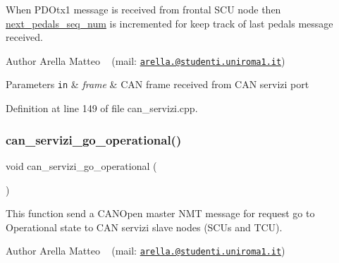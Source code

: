 When P\+D\+Otx1 message is received from frontal S\+CU node then \mbox{\hyperlink{group___c_a_n__servizi__group_gadcbd4ad67b50cf61731266bf5c5ba158}{next\+\_\+pedals\+\_\+seq\+\_\+num}} is incremented for keep track of last pedals message received.

\begin{DoxyAuthor}{Author}
Arella Matteo ~\newline
 (mail\+: \href{mailto:arella.1646983@studenti.uniroma1.it}{\tt arella.@studenti.\+uniroma1.\+it})
\end{DoxyAuthor}

\begin{DoxyParams}[1]{Parameters}
\mbox{\tt in}  & {\em frame} & C\+AN frame received from C\+AN servizi port \\
\hline
\end{DoxyParams}


Definition at line 149 of file can\+\_\+servizi.\+cpp.

\mbox{\label{group___c_a_n__servizi__group_gad444fb6be3b439dcfbefff66e85efd94}} 
\subsubsection{\texorpdfstring{can\+\_\+servizi\+\_\+go\+\_\+operational()}{can\_servizi\_go\_operational()}}
{\footnotesize\ttfamily void can\+\_\+servizi\+\_\+go\+\_\+operational (\begin{DoxyParamCaption}{ }\end{DoxyParamCaption})}



This function send a C\+A\+N\+Open master N\+MT message for request \textquotesingle{}go to Operational\textquotesingle{} state to C\+AN servizi slave nodes (S\+C\+Us and T\+CU). 

\begin{DoxyAuthor}{Author}
Arella Matteo ~\newline
 (mail\+: \href{mailto:arella.1646983@studenti.uniroma1.it}{\tt arella.@studenti.\+uniroma1.\+it}) 
\end{DoxyAuthor}


